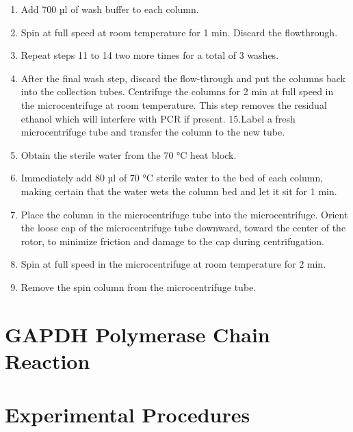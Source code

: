 \documentclass[]{book}
\providecommand{\tightlist}{%
  \setlength{\itemsep}{0pt}\setlength{\parskip}{0pt}}
\theoremstyle{definition}
\theoremstyle{definition}
\theoremstyle{definition}
\theoremstyle{remark}
\begin{document}
\begin{enumerate}
\def\labelenumi{\arabic{enumi}.}
\setcounter{enumi}{12}
\tightlist
\item
  Add 700 µl of wash buffer to each column.
\item
  Spin at full speed at room temperature for 1 min. Discard the
  flowthrough.
\item
  Repeat steps 11 to 14 two more times for a total of 3 washes.
\item
  After the final wash step, discard the flow-through and put the
  columns back into the collection tubes. Centrifuge the columns for 2
  min at full speed in the microcentrifuge at room temperature. This
  step removes the residual ethanol which will interfere with PCR if
  present. 15.Label a fresh microcentrifuge tube and transfer the column
  to the new tube.
\item
  Obtain the sterile water from the 70 °C heat block.
\item
  Immediately add 80 µl of 70 °C sterile water to the bed of each
  column, making certain that the water wets the column bed and let it
  sit for 1 min.
\item
  Place the column in the microcentrifuge tube into the microcentrifuge.
  Orient the loose cap of the microcentrifuge tube downward, toward the
  center of the rotor, to minimize friction and damage to the cap during
  centrifugation.
\item
  Spin at full speed in the microcentrifuge at room temperature for 2
  min.
\item
  Remove the spin column from the microcentrifuge tube.
\end{enumerate}

\section{GAPDH Polymerase Chain
Reaction}\label{gapdh-polymerase-chain-reaction}

\section{Experimental Procedures}\label{experimental-procedures-8}
\end{document}
